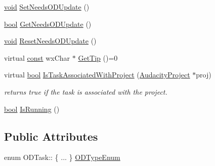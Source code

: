 \begin{DoxyCompactItemize}
\hyperlink{sound_8c_ae35f5844602719cf66324f4de2a658b3}{void} \hyperlink{class_o_d_task_a70cfd63300b8bcdbe42e224046f86932}{Set\+Needs\+O\+D\+Update} ()
\item 
\hyperlink{mac_2config_2i386_2lib-src_2libsoxr_2soxr-config_8h_abb452686968e48b67397da5f97445f5b}{bool} \hyperlink{class_o_d_task_ab2451ca624aa10332d5faeaaae994fa9}{Get\+Needs\+O\+D\+Update} ()
\item 
\hyperlink{sound_8c_ae35f5844602719cf66324f4de2a658b3}{void} \hyperlink{class_o_d_task_a2dc57dc72cc1c8e057cee5d471d217e5}{Reset\+Needs\+O\+D\+Update} ()
\item 
virtual \hyperlink{getopt1_8c_a2c212835823e3c54a8ab6d95c652660e}{const} wx\+Char $\ast$ \hyperlink{class_o_d_task_ac3f49c9c387de5c5cad4b5457c3fe7f8}{Get\+Tip} ()=0
\item 
virtual \hyperlink{mac_2config_2i386_2lib-src_2libsoxr_2soxr-config_8h_abb452686968e48b67397da5f97445f5b}{bool} \hyperlink{class_o_d_task_a0abf3d0247adbf354be5d207d0800cec}{Is\+Task\+Associated\+With\+Project} (\hyperlink{class_audacity_project}{Audacity\+Project} $\ast$proj)
\begin{DoxyCompactList}\small\item\em returns true if the task is associated with the project. \end{DoxyCompactList}\item 
\hyperlink{mac_2config_2i386_2lib-src_2libsoxr_2soxr-config_8h_abb452686968e48b67397da5f97445f5b}{bool} \hyperlink{class_o_d_task_a42704b882937363771e1b9924e0f6c7a}{Is\+Running} ()
\end{DoxyCompactItemize}
\subsection*{Public Attributes}
\begin{DoxyCompactItemize}
\item 
enum O\+D\+Task\+:: \{ ... \}  \hyperlink{class_o_d_task_a4ec3640943ae9a1af7c4d4081213a7ff}{O\+D\+Type\+Enum}
\end{DoxyCompactItemize}

